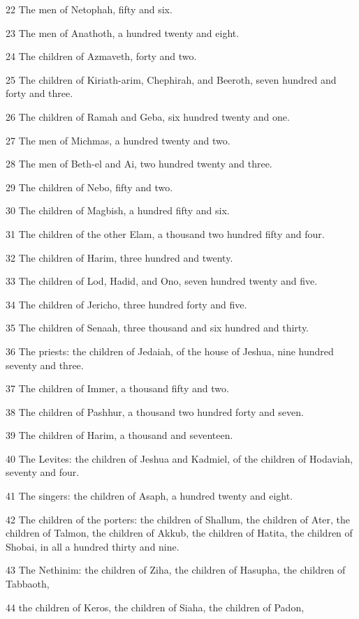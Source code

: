 \par 22 The men of Netophah, fifty and six.
\par 23 The men of Anathoth, a hundred twenty and eight.
\par 24 The children of Azmaveth, forty and two.
\par 25 The children of Kiriath-arim, Chephirah, and Beeroth, seven hundred and forty and three.
\par 26 The children of Ramah and Geba, six hundred twenty and one.
\par 27 The men of Michmas, a hundred twenty and two.
\par 28 The men of Beth-el and Ai, two hundred twenty and three.
\par 29 The children of Nebo, fifty and two.
\par 30 The children of Magbish, a hundred fifty and six.
\par 31 The children of the other Elam, a thousand two hundred fifty and four.
\par 32 The children of Harim, three hundred and twenty.
\par 33 The children of Lod, Hadid, and Ono, seven hundred twenty and five.
\par 34 The children of Jericho, three hundred forty and five.
\par 35 The children of Senaah, three thousand and six hundred and thirty.
\par 36 The priests: the children of Jedaiah, of the house of Jeshua, nine hundred seventy and three.
\par 37 The children of Immer, a thousand fifty and two.
\par 38 The children of Pashhur, a thousand two hundred forty and seven.
\par 39 The children of Harim, a thousand and seventeen.
\par 40 The Levites: the children of Jeshua and Kadmiel, of the children of Hodaviah, seventy and four.
\par 41 The singers: the children of Asaph, a hundred twenty and eight.
\par 42 The children of the porters: the children of Shallum, the children of Ater, the children of Talmon, the children of Akkub, the children of Hatita, the children of Shobai, in all a hundred thirty and nine.
\par 43 The Nethinim: the children of Ziha, the children of Hasupha, the children of Tabbaoth,
\par 44 the children of Keros, the children of Siaha, the children of Padon,
